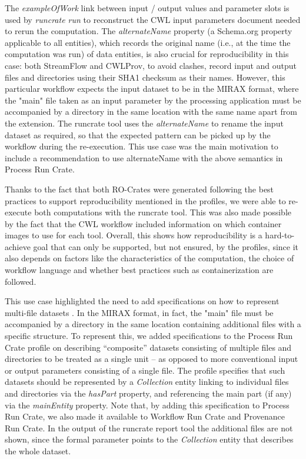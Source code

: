 \begin{figure}
\end{figure}



The \emph{exampleOfWork} link between input / output values and parameter slots is used by \emph{runcrate run} to reconstruct the CWL input parameters document needed to rerun the computation.
The
\emph{alternateName} property (a Schema.org property applicable to all entities), which records the original name (i.e., at the time the computation was run) of data entities, is also crucial for reproducibility in this case: both StreamFlow and CWLProv, to avoid clashes, record input and output files and directories using their SHA1
checksum as their names. 
However, this particular workflow expects the input dataset to be in the MIRAX  format, where the "main" file taken as an input parameter by the processing application must be accompanied by a directory in the same location with the same name apart from the extension.
The runcrate tool uses the \emph{alternateName} to rename the input dataset as required, so that the expected pattern can be picked up by the workflow during the re-execution.
This use case was the main motivation to include a recommendation to use alternateName with the above semantics in Process Run Crate.

Thanks to the fact that both RO-Crates were generated following the best practices to support reproducibility mentioned in the profiles, we were able to re-execute both computations with the runcrate tool.
This was also made possible by the fact that the CWL workflow included information on which container images to use for each tool.
Overall, this shows how reproducibility is a hard-to-achieve goal that can only be supported, but not ensured, by the profiles, since it also depends on factors like the characteristics of the computation, the choice of workflow language and whether best practices such as containerization are followed.

This use case highlighted the need to add specifications on how to represent multi-file datasets \cite[section Representing multi-file objects]{WRROC 2023a}. In the MIRAX format, in fact, the "main" file must be accompanied by a directory in the same location containing additional files with a specific structure.
To represent this, we added specifications to the Process Run Crate profile on describing “composite” datasets consisting of multiple files and directories to be treated as a single unit – as opposed to more conventional input or output parameters consisting of a single file. The profile specifies that such datasets should be represented by a \emph{Collection} entity linking to individual files and directories via the \emph{hasPart} property, and referencing the main part (if any) via the \emph{mainEntity} property. Note that, by adding this specification to Process Run Crate, we also made it available to Workflow Run Crate and Provenance Run Crate. In the output of the runcrate report tool the additional files are not shown, since the formal parameter points to the \emph{Collection} entity that describes the whole dataset.

